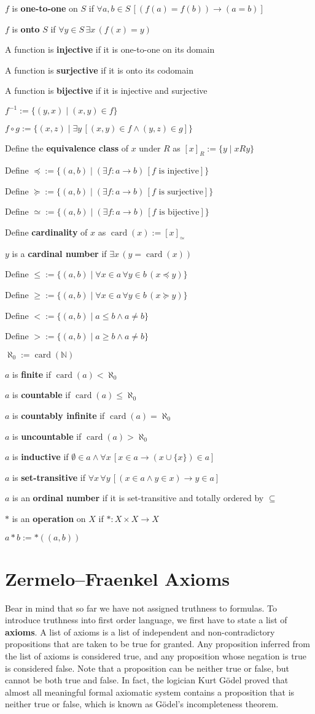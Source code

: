 \documentclass[11pt]{book}
\newcommand{\env}[2]{\begin{#1}#2\end{#1}}
\DeclareMathOperator{\card}{\operatorname{card}}
\begin{document}
\env{definition}{$f$ is \textbf{one-to-one} on $S$ if $\forall a,b\in S\,[(f(a)=f(b))\rightarrow (a=b)]$}
\env{definition}{$f$ is \textbf{onto} $S$ if $\forall y\in S\,\exists x\,(f(x)=y)$}
\env{definition}{A function is \textbf{injective} if it is one-to-one on its domain}
\env{definition}{A function is \textbf{surjective} if it is onto its codomain}
\env{definition}{A function is \textbf{bijective} if it is injective and surjective}
\env{definition}{$f^{-1}:=\{(y,x)\mid (x,y)\in f\}$}
\env{definition}{$f\circ g:=\{(x,z)\mid \exists y\,[(x,y)\in f\land (y,z)\in g]\}$}
\env{definition}{Define the \textbf{equivalence class} of $x$ under $R$ as $[x]_R:=\{y\mid xRy\}$}
\env{definition}{Define $\preceq:=\{(a,b)\mid (\exists f:a\rightarrow  b)\,[f\textrm{\ is\ injective}]\}$}
\env{definition}{Define $\succeq:=\{(a,b)\mid (\exists f:a\rightarrow  b)\,[f\textrm{\ is\ surjective}]\}$}
\env{definition}{Define $\simeq:=\{(a,b)\mid (\exists f:a\rightarrow  b)\,[f\textrm{\ is\ bijective}]\}$}
\env{definition}{Define \textbf{cardinality} of $x$ as $\card(x):=[x]_{\simeq}$}
\env{definition}{$y$ is a \textbf{cardinal number} if $\exists x\,(y=\card(x))$}
\env{definition}{Define $\le:=\{(a,b)\mid \forall x\in a\,\forall y\in b\,(x\preceq y)\}$}
\env{definition}{Define $\ge:=\{(a,b)\mid \forall x\in a\,\forall y\in b\,(x\succeq y)\}$}
\env{definition}{Define $<:=\{(a,b)\mid a\le b\land a\ne b\}$}
\env{definition}{Define $>:=\{(a,b)\mid a\ge b\land a\ne b\}$}
\env{definition}{$\aleph_0:=\card(\mathbb{N})$}
\env{definition}{$a$ is \textbf{finite} if $\card(a)< \aleph_0$}
\env{definition}{$a$ is \textbf{countable} if $\card(a)\le \aleph_0$}
\env{definition}{$a$ is \textbf{countably infinite} if $\card(a)=\aleph_0$}
\env{definition}{$a$ is \textbf{uncountable} if $\card(a)>\aleph_0$}
\env{definition}{$a$ is \textbf{inductive} if $\emptyset\in a\land\forall x\,[x\in a\rightarrow (x\cup \{x\})\in a]$}
\env{definition}{$a$ is \textbf{set-transitive} if $\forall x\,\forall y\,[(x\in a\land y\in x)\rightarrow y\in a]$}
\env{definition}{$a$ is an \textbf{ordinal number} if it is set-transitive and totally ordered by $\subseteq$}
\env{definition}{$*$ is an \textbf{operation} on $X$ if $*:X\times X\rightarrow X$}
\env{definition}{\label{def:end}$a*b:=*((a,b))$}

\newpage

\section{Zermelo–Fraenkel Axioms}
Bear in mind that so far we have not assigned truthness to formulas. To introduce truthness into first order language, we first have to state a list of \textbf{axioms}. A list of axioms is a list of independent and non-contradictory propositions that are taken to be true for granted. Any proposition inferred from the list of axioms is considered true, and any proposition whose negation is true is considered false. Note that a proposition can be neither true or false, but cannot be both true and false. In fact, the logician Kurt G\"odel proved that almost all meaningful formal axiomatic system contains a proposition that is neither true or false, which is known as G\"odel's incompleteness theorem.
\end{document}
